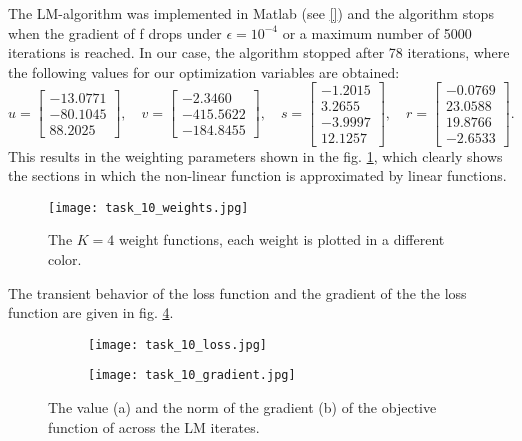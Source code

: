 \documentclass[a4paper,12pt]{report}
\begin{document}
The LM-algorithm was implemented in Matlab (see \ref{}) and the algorithm stops when the gradient of f drops under $\epsilon = 10^{-4}$ or a maximum number of 5000 iterations is reached. In our case, the algorithm stopped after 78 iterations, where the following values for our optimization variables are obtained: 
\[
u = \begin{bmatrix}
   -13.0771 \\ -80.1045 \\ 88.2025
  \end{bmatrix}, \quad 
  v = \begin{bmatrix}
   -2.3460 \\ -415.5622 \\ -184.8455
\end{bmatrix}, \quad 
s = \begin{bmatrix}
  -1.2015 \\ 3.2655 \\ -3.9997 \\ 12.1257
\end{bmatrix}, \quad 
r = \begin{bmatrix}
  -0.0769 \\ 23.0588 \\ 19.8766 \\ -2.6533
\end{bmatrix} .
\]
This results in the weighting parameters shown in the fig. \ref{task_10_weights}, which clearly shows the sections in which the non-linear function is approximated by linear functions. 
\begin{figure}[htbp]
    \centering
        \texttt{[image: task\_10\_weights.jpg]}
        \caption{The $K=4$ weight functions, each weight is plotted in a different color.}
        \label{task_10_weights}
\end{figure}
The transient behavior of the loss function and the gradient of the the loss function are given in fig. \ref{task_10_iterations}. 
\begin{figure}[htbp]
  \centering
  \begin{subfigure}[b]{0.49\textwidth}
    \centering
    \texttt{[image: task\_10\_loss.jpg]}
    \caption{}
    \label{task_10_loss}
  \end{subfigure}
  \hfill
  \begin{subfigure}[b]{0.49\textwidth}
    \centering
    \texttt{[image: task\_10\_gradient.jpg]}
    \caption{}
    \label{task_10_gradient}
  \end{subfigure}
  \caption{The value (a) and the norm of the gradient (b) of the objective function of across the LM iterates.}
  \label{task_10_iterations}
\end{figure}
\end{document}
